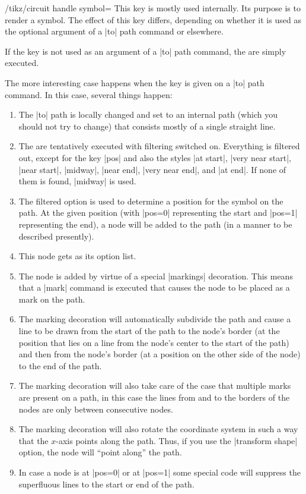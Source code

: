 \begin{key}{/tikz/circuit handle symbol=}
    This key is mostly used internally. Its purpose is to render a symbol. The
    effect of this key differs, depending on whether it is used as the optional
    argument of a |to| path command or elsewhere.

    If the key is not used as an argument of a |to| path command, the
     are simply executed.

    The more interesting case happens when the key is given on a |to| path
    command. In this case, several things happen:
    \begin{enumerate}
        \item The |to| path is locally changed and set to an internal path
            (which you should not try to change) that consists mostly of a
            single straight line.
        \item The  are tentatively executed with filtering
            switched on. Everything is filtered out, except for the key |pos|
            and also the styles |at start|, |very near start|, |near start|,
            |midway|, |near end|, |very near end|, and |at end|. If none of
            them is found, |midway| is used.
        \item The filtered option is used to determine a position for the
            symbol on the path. At the given position (with |pos=0|
            representing the start and |pos=1| representing the end), a node
            will be added to the path (in a manner to be described presently).
        \item This node gets  as its option list.
        \item The node is added by virtue of a special |markings| decoration.
            This means that a |mark| command is executed that causes the node
            to be placed as a mark on the path.
        \item The marking decoration will automatically subdivide the path and
            cause a line to be drawn from the start of the path to the node's
            border (at the position that lies on a line from the node's center
            to the start of the path) and then from the node's border (at a
            position on the other side of the node) to the end of the path.
        \item The marking decoration will also take care of the case that
            multiple marks are present on a path, in this case the lines from
            and to the borders of the nodes are only between consecutive nodes.
        \item The marking decoration will also rotate the coordinate system in
            such a way that the $x$-axis points along the path. Thus, if you
            use the |transform shape| option, the node will ``point along'' the
            path.
        \item In case a node is at |pos=0| or at |pos=1| some special code will
            suppress the superfluous lines to the start or end of the path.
    \end{enumerate}


\end{key}
